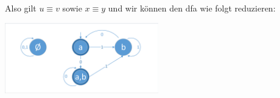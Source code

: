 \documentclass{article}
\begin{document}
Also gilt $u \equiv v$ sowie $x \equiv y$ und wir können den dfa wie folgt reduzieren:

\begin{minipage}{\textwidth}
	\centering \includegraphics[width=0.5\textwidth,page=3,trim={2 2 2 4},clip]{dfas.pdf}
\end{minipage}
\end{document}
